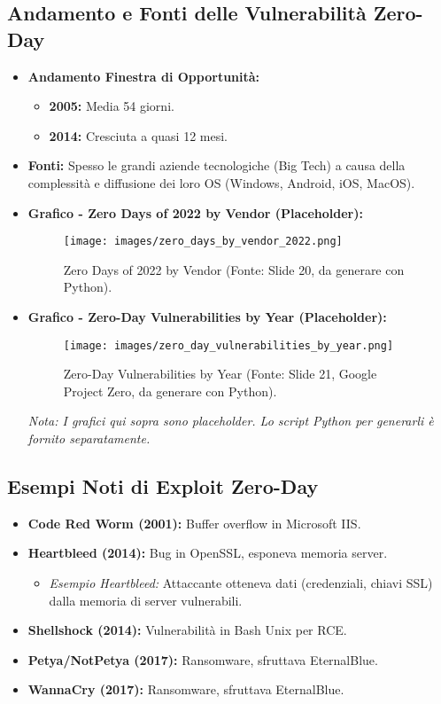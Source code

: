 \subsection{Andamento e Fonti delle Vulnerabilità Zero-Day}
\begin{itemize}
    \item \textbf{Andamento Finestra di Opportunità:}
    \begin{itemize}
        \item \textbf{2005:} Media 54 giorni.
        \item \textbf{2014:} Cresciuta a quasi 12 mesi.
    \end{itemize}
    \item \textbf{Fonti:} Spesso le grandi aziende tecnologiche (Big Tech) a causa della complessità e diffusione dei loro OS (Windows, Android, iOS, MacOS).
    \item \textbf{Grafico - Zero Days of 2022 by Vendor (Placeholder):}
    \begin{figure}[H]
        \centering
        \texttt{[image: images/zero\_days\_by\_vendor\_2022.png]}
        \caption{Zero Days of 2022 by Vendor (Fonte: Slide 20, da generare con Python).}
        \label{fig:zero_days_vendor}
    \end{figure}
    \item \textbf{Grafico - Zero-Day Vulnerabilities by Year (Placeholder):}
    \begin{figure}[H]
        \centering
        \texttt{[image: images/zero\_day\_vulnerabilities\_by\_year.png]}
        \caption{Zero-Day Vulnerabilities by Year (Fonte: Slide 21, Google Project Zero, da generare con Python).}
        \label{fig:zero_days_year}
    \end{figure}
    \textit{Nota: I grafici qui sopra sono placeholder. Lo script Python per generarli è fornito separatamente.}
\end{itemize}

\subsection{Esempi Noti di Exploit Zero-Day}
\begin{itemize}
    \item \textbf{Code Red Worm (2001):} Buffer overflow in Microsoft IIS.
    \item \textbf{Heartbleed (2014):} Bug in OpenSSL, esponeva memoria server.
        \begin{itemize}
            \item \textit{Esempio Heartbleed:} Attaccante otteneva dati (credenziali, chiavi SSL) dalla memoria di server vulnerabili.
        \end{itemize}
    \item \textbf{Shellshock (2014):} Vulnerabilità in Bash Unix per RCE.
    \item \textbf{Petya/NotPetya (2017):} Ransomware, sfruttava EternalBlue.
    \item \textbf{WannaCry (2017):} Ransomware, sfruttava EternalBlue.
\end{itemize}


